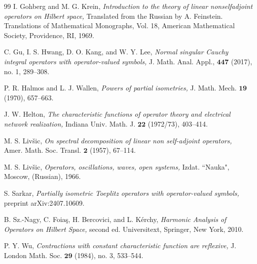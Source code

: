 \documentclass[12pt]{amsart}
\theoremstyle{definition}
\theoremstyle{plain}
\theoremstyle{definition}
\numberwithin{equation}{section}
\begin{document}
\begin{thebibliography}{99}
{I. Gohberg and M. G. Krein,} 
{\it Introduction to the theory of linear nonselfadjoint operators on Hilbert space,}
{Translated from the Russian by A. Feinstein. Translations of Mathematical Monographs, Vol. 18, American Mathematical Society, Providence, RI, 1969.}

{C. Gu, I. S. Hwang, D. O. Kang, and W. Y. Lee,}
{\it Normal singular Cauchy integral operators with operator-valued symbols,}
{J. Math. Anal. Appl., $\bm{447}$ (2017), no. 1, 289--308}.


{P. R. Halmos and L. J. Wallen,}
{\it Powers of partial isometries,}
{J. Math. Mech. $\bm{19}$ (1970), 657--663.}

{J. W. Helton,} 
{\it The characteristic functions of operator theory and electrical network realization,} 
{Indiana Univ. Math. J. $\bm{22}$ (1972/73), 403--414.}


{M. S. Liv\v{s}ic,}
{\it On spectral decomposition of linear non self-adjoint operators,}
{Amer. Math. Soc. Transl. $\bm{2}$ (1957), 67--114.}


{M. S. Liv\v{s}ic,}
{\it Operators, oscillations, waves, open systems,} 
{Izdat. ``Nauka", Moscow, (Russian), 1966.}


{S. Sarkar,}
{\it Partially isometric Toeplitz operators with operator-valued symbols,} 
{preprint arXiv:2407.10609.}


{B. Sz.-Nagy, C. Foia\c{s}, H. Bercovici, and L. K\'{e}rchy,} 
{\it Harmonic Analysis of Operators on Hilbert Space,} 
{second ed. Universitext, Springer, New York, 2010.}


{P. Y. Wu,}
{\it Contractions with constant characteristic function are reflexive,}
{J. London Math. Soc. $\bm{29}$ (1984),  no. 3, 533--544.}

\end{thebibliography}
\end{document}
